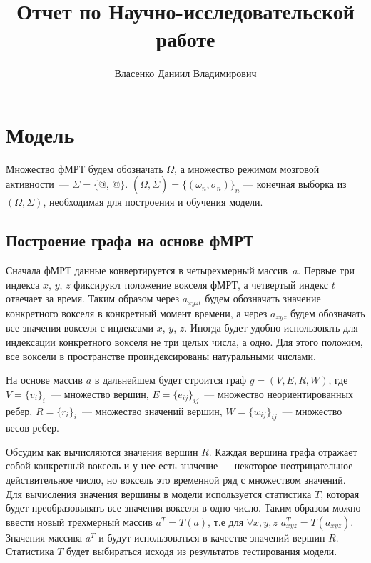\documentclass[specialist,
substylefile = spbu_report.rtx,
subf,href,colorlinks=true, 12pt]{disser}
\makeatletter
\newcommand*{\rom}[1]{\expandafter\@slowromancap\romannumeral #1@}
\makeatother
\begin{document}
	
	\title{Отчет по Научно-исследовательской работе}	
	\author{Власенко Даниил Владимирович}
	\date{\number\year}	
	\maketitle
	\tableofcontents
	

	
	\chapter{Модель}	
	Множество фМРТ будем обозначать $\Omega$, а множество режимом мозговой активности~--- $\Sigma = \{$\rom{1}, \rom{2}$\}$. $(\widetilde{\Omega}, \widetilde{\Sigma}) =  \{(\omega_{n}, \sigma_{n})\}_n$ --- конечная выборка из $(\Omega, \Sigma)$, необходимая для построения и обучения модели.				
	
	\section{Построение графа на основе фМРТ} 			
	Сначала фМРТ данные конвертируется в четырехмерный массив~$a$. Первые три индекса $x$, $y$, $z$ фиксируют положение вокселя фМРТ, а четвертый индекс $t$ отвечает за время. Таким образом через $a_{xyzt}$ будем обозначать значение конкретного вокселя в конкретный момент времени, а через $a_{xyz}$ будем обозначать все значения вокселя с индексами $x$, $y$, $z$. Иногда будет удобно использовать для индексации конкретного вокселя не три целых числа, а одно. Для этого положим, все воксели в пространстве проиндексированы натуральными числами.		
	
	На основе массив $a$ в дальнейшем будет строится граф $g = (V, E, R, W)$, где $V = \{v_i\}_i$~--- множество вершин, $E = \{e_{ij}\}_{ij}$~--- множество неориентированных ребер, $R = \{r_i\}_i$~--- множество значений вершин, $W = \{w_{ij}\}_{ij}$~--- множество весов ребер.
	
	Обсудим как вычисляются значения вершин $R$. Каждая вершина графа отражает собой конкретный воксель и у нее есть значение --- некоторое неотрицательное действительное число, но воксель это временной ряд с множеством значений. Для вычисления значения вершины в модели используется статистика $T$, которая будет преобразовывать все значения вокселя в одно число. Таким образом можно ввести новый трехмерный массив $a^{T} = T(a)$, т.е для $\forall x, y, z$ $a^{T}_{xyz} = T(a_{xyz})$. Значения массива $a^{T}$ и будут использоваться в качестве значений вершин $R$. Статистика $T$ будет выбираться исходя из результатов тестирования модели.
	
\end{document}
